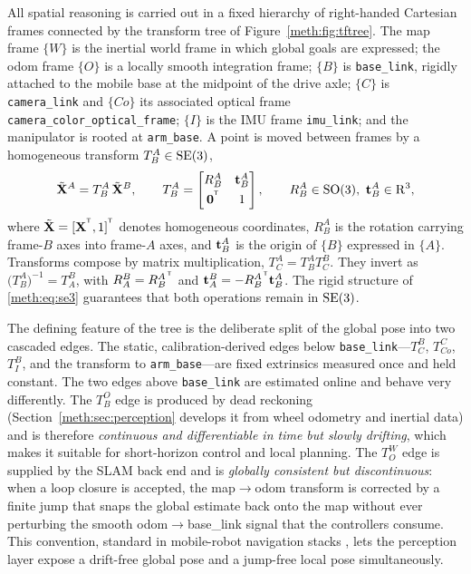 All spatial reasoning is carried out in a fixed hierarchy of right-handed Cartesian frames connected by the transform tree of Figure~\ref{meth:fig:tftree}. The map frame $\{W\}$ is the inertial world frame in which global goals are expressed; the odom frame $\{O\}$ is a locally smooth integration frame; $\{B\}$ is \texttt{base\_link}, rigidly attached to the mobile base at the midpoint of the drive axle; $\{C\}$ is \texttt{camera\_link} and $\{Co\}$ its associated optical frame \texttt{camera\_\allowbreak{}color\_\allowbreak{}optical\_\allowbreak{}frame}; $\{I\}$ is the IMU frame \texttt{imu\_link}; and the manipulator is rooted at \texttt{arm\_base}. A point is moved between frames by a homogeneous transform $T^{A}_{B}\in\mathrm{SE}(3)$,
\begin{equation}
\tilde{\mathbf{X}}^{A} = T^{A}_{B}\,\tilde{\mathbf{X}}^{B},
\qquad
T^{A}_{B} =
\begin{bmatrix} R^{A}_{B} & \mathbf{t}^{A}_{B} \\[2pt] \mathbf{0}^{^{\mathsf{T}}} & 1 \end{bmatrix},
\qquad R^{A}_{B}\in\mathrm{SO}(3),\ \mathbf{t}^{A}_{B}\in\mathrm{R}^{3},
\label{meth:eq:se3}
\end{equation}
where $\tilde{\mathbf{X}}=[\mathbf{X}^{^{\mathsf{T}}},1]^{^{\mathsf{T}}}$ denotes homogeneous coordinates, $R^{A}_{B}$ is the rotation carrying frame-$B$ axes into frame-$A$ axes, and $\mathbf{t}^{A}_{B}$ is the origin of $\{B\}$ expressed in $\{A\}$. Transforms compose by matrix multiplication, $T^{A}_{C}=T^{A}_{B}T^{B}_{C}$. They invert as $\big(T^{A}_{B}\big)^{-1}=T^{B}_{A}$, with $R^{B}_{A}=R^{A\,^{\mathsf{T}}}_{B}$ and $\mathbf{t}^{B}_{A}=-R^{A\,^{\mathsf{T}}}_{B}\mathbf{t}^{A}_{B}$. The rigid structure of \eqref{meth:eq:se3} guarantees that both operations remain in $\mathrm{SE}(3)$.

The defining feature of the tree is the deliberate split of the global pose into two cascaded edges. The static, calibration-derived edges below \texttt{base\_link}---$T^{B}_{C}$, $T^{C}_{Co}$, $T^{B}_{I}$, and the transform to \texttt{arm\_base}---are fixed extrinsics measured once and held constant. The two edges above \texttt{base\_link} are estimated online and behave very differently. The $T^{O}_{B}$ edge is produced by dead reckoning (Section~\ref{meth:sec:perception} develops it from wheel odometry and inertial data) and is therefore \emph{continuous and differentiable in time but slowly drifting}, which makes it suitable for short-horizon control and local planning. The $T^{W}_{O}$ edge is supplied by the SLAM back end and is \emph{globally consistent but discontinuous}: when a loop closure is accepted, the map$\rightarrow$odom transform is corrected by a finite jump that snaps the global estimate back onto the map without ever perturbing the smooth odom$\rightarrow$base\_link signal that the controllers consume. This convention, standard in mobile-robot navigation stacks \cite{siegwart2011mobile}, lets the perception layer expose a drift-free global pose and a jump-free local pose simultaneously.

